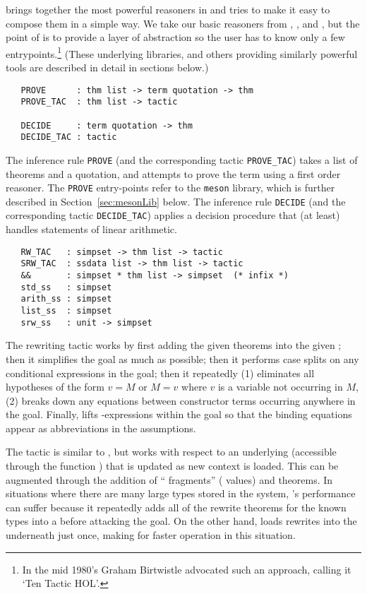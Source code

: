  brings together the most powerful reasoners in \HOL{} and
tries to make it easy to compose them in a simple way. We take our basic
reasoners from , , and ,
but the point of  is to provide a layer of abstraction so
the user has to know only a few entrypoints.\footnote{In the mid 1980's
Graham Birtwistle advocated such an approach, calling it `Ten Tactic
HOL'.} (These underlying libraries, and others providing similarly
powerful tools are described in detail in sections below.)

\begin{verbatim}
   PROVE      : thm list -> term quotation -> thm
   PROVE_TAC  : thm list -> tactic

   DECIDE     : term quotation -> thm
   DECIDE_TAC : tactic
\end{verbatim}

The inference rule \texttt{PROVE} (and the corresponding tactic
\texttt{PROVE\_TAC}) takes a list of theorems and a quotation, and
attempts to prove the term using a first order reasoner.  The
\texttt{PROVE} entry-points refer to the \texttt{meson} library, which
is further described in Section~\ref{sec:mesonLib} below. The
inference rule \texttt{DECIDE} (and the corresponding tactic
\texttt{DECIDE\_TAC}) applies a decision procedure that (at least)
handles statements of linear arithmetic.

\begin{verbatim}
   RW_TAC   : simpset -> thm list -> tactic
   SRW_TAC  : ssdata list -> thm list -> tactic
   &&       : simpset * thm list -> simpset  (* infix *)
   std_ss   : simpset
   arith_ss : simpset
   list_ss  : simpset
   srw_ss   : unit -> simpset
\end{verbatim}

The rewriting tactic  works by first adding the given
theorems into the given \simpset; then it simplifies the goal as much
as possible; then it performs case splits on any conditional
expressions in the goal; then it repeatedly (1) eliminates all
hypotheses of the form $v = M$ or $M = v$ where $v$ is a variable not
occurring in $M$, (2) breaks down any equations between constructor
terms occurring anywhere in the goal. Finally,  lifts
-expressions within the goal so that the binding equations
appear as abbreviations in the
assumptions.

The tactic  is similar to , but works
with respect to an underlying \simpset{} (accessible through the
function ) that is updated as new context is loaded.
This \simpset{} can be augmented through the addition of ``\simpset{}
fragments'' ( values) and theorems.  In situations
where there are many large types stored in the system,
's performance can suffer because it repeatedly adds
all of the rewrite theorems for the known types into a \simpset{}
before attacking the goal.  On the other hand,  loads
rewrites into the \simpset{} underneath  just once,
making for faster operation in this situation.

